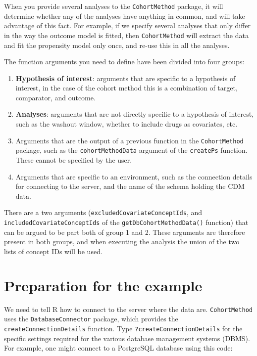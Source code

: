 \documentclass[
]{article}
\providecommand{\tightlist}{%
  \setlength{\itemsep}{0pt}\setlength{\parskip}{0pt}}
\begin{document}
When you provide several analyses to the \texttt{CohortMethod} package,
it will determine whether any of the analyses have anything in common,
and will take advantage of this fact. For example, if we specify several
analyses that only differ in the way the outcome model is fitted, then
\texttt{CohortMethod} will extract the data and fit the propensity model
only once, and re-use this in all the analyses.

The function arguments you need to define have been divided into four
groups:

\begin{enumerate}
\def\labelenumi{\arabic{enumi}.}
\tightlist
\item
  \textbf{Hypothesis of interest}: arguments that are specific to a
  hypothesis of interest, in the case of the cohort method this is a
  combination of target, comparator, and outcome.
\item
  \textbf{Analyses}: arguments that are not directly specific to a
  hypothesis of interest, such as the washout window, whether to include
  drugs as covariates, etc.
\item
  Arguments that are the output of a previous function in the
  \texttt{CohortMethod} package, such as the \texttt{cohortMethodData}
  argument of the \texttt{createPs} function. These cannot be specified
  by the user.
\item
  Arguments that are specific to an environment, such as the connection
  details for connecting to the server, and the name of the schema
  holding the CDM data.
\end{enumerate}

There are a two arguments (\texttt{excludedCovariateConceptIds}, and
\texttt{includedCovariateConceptIds} of the
\texttt{getDbCohortMethodData()} function) that can be argued to be part
both of group 1 and 2. These arguments are therefore present in both
groups, and when executing the analysis the union of the two lists of
concept IDs will be used.

\hypertarget{preparation-for-the-example}{%
\section{Preparation for the
example}\label{preparation-for-the-example}}

We need to tell R how to connect to the server where the data are.
\texttt{CohortMethod} uses the \texttt{DatabaseConnector} package, which
provides the \texttt{createConnectionDetails} function. Type
\texttt{?createConnectionDetails} for the specific settings required for
the various database management systems (DBMS). For example, one might
connect to a PostgreSQL database using this code:
\end{document}
